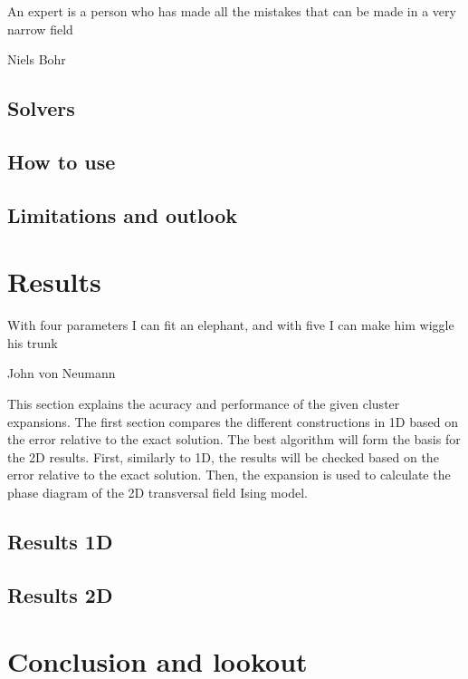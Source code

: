 \documentclass{book}
\newcounter{a}
\newcounter{b}
\begin{document}

\epigraph{An expert is a person who has made all the mistakes that can be made in a very narrow field}{Niels Bohr}

\section{Solvers} \label{sec:framework_impl}


\section{How to use}


\section{Limitations and outlook}


\chapter{Results} \label{chap:results}

\epigraph{With four parameters I can fit an elephant, and with five I can make him wiggle his trunk}{John von Neumann}

%

This section explains the acuracy and performance of the given cluster expansions. The first section compares the different constructions in 1D based on the error relative to the exact solution. The best algorithm will form the basis for the 2D results. First, similarly to 1D, the results will be checked based on the error relative to the exact solution. Then, the expansion is used to calculate the phase diagram of the 2D transversal field Ising model.

\section{Results 1D}\label{sec:results1d}


\section{Results 2D}


\chapter{Conclusion and lookout}




\end{document}
